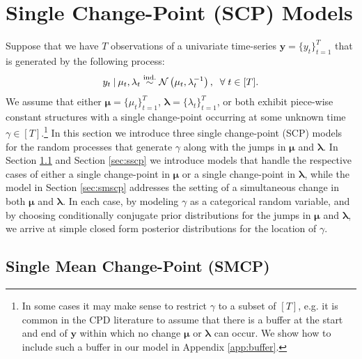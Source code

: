 \section{Single Change-Point (SCP) Models}
\label{sec:scp}

Suppose that we have $T$ observations of a univariate time-series $\mathbf{y} = \{y_t\}_{t=1}^{T}$ that is generated by the following process:
\begin{align}\label{eq:dgp}
    y_t \:|\: \mu_t, \lambda_t \overset{\text{ind.}}{\sim} \mathcal{N}\left(\mu_t, \lambda^{-1}_t\right), \;\;\forall\; t \in [T].
\end{align}
We assume that either $\pmb{\mu} = \{\mu_t\}_{t=1}^{T}$, $\pmb{\lambda} = \{\lambda_t\}^{T}_{t=1}$, or both exhibit piece-wise constant structures with a single change-point occurring at some unknown time $\gamma \in [T]$.\footnote{In some cases it may make sense to restrict $\gamma$ to a subset of $[T]$, e.g. it is common in the CPD literature to assume that there is a buffer at the start and end of $\mathbf{y}$ within which no change $\pmb{\mu}$ or $\pmb{\lambda}$ can occur. We show how to include such a buffer in our model in Appendix \ref{app:buffer}.} In this section we introduce three single change-point (SCP) models for the random processes that generate $\gamma$ along with the jumps in $\pmb{\mu}$ and $\pmb{\lambda}$. In Section \ref{sec:smcp} and Section \ref{sec:sscp} we introduce models that handle the respective cases of either a single change-point in $\pmb{\mu}$ or a single change-point in $\pmb{\lambda}$, while the model in Section \ref{sec:smscp} addresses the setting of a simultaneous change in both $\pmb{\mu}$ and $\pmb{\lambda}$. In each case, by modeling $\gamma$ as a categorical random variable, and by choosing conditionally conjugate prior distributions for the jumps in $\pmb{\mu}$ and $\pmb{\lambda}$, we arrive at simple closed form posterior distributions for the location of $\gamma$. 

\subsection{Single Mean Change-Point (SMCP)}
\label{sec:smcp}

